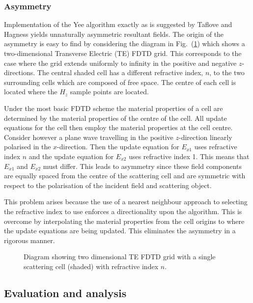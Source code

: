 \documentclass[a4paper, 12pt]{article}
\newcommand{\rfig}[1]{Fig.\ (\ref{#1})}
\begin{document}
	\subsubsection{Asymmetry}
	Implementation of the Yee algorithm exactly as is suggested by Taflove
	and Hagness \cite{taflove00book} yields unnaturally asymmetric
	resultant fields. The origin of the asymmetry is easy to find by
	considering the diagram in \rfig{fig:fdtd:2dasym} which shows a
	two-dimensional Transverse Electric (TE) FDTD grid. This corresponds
	to the case where the grid extends uniformly to infinity in the positive and
	negative $z$-directions. The central shaded cell has a different
	refractive index, $n$, to the two surrounding cells which are composed
	of free space. The centre of each cell
	is located where the $H_z$ sample points are located. 
	
	Under the most basic FDTD scheme the material properties of a cell are
	determined by the material properties of the centre of the cell. All
	update equations for the cell then employ the material properties at
	the cell centre. Consider however a plane wave travelling in the
	positive $z$-direction linearly polarised in the $x$-direction. Then
	the update equation for $E_{x1}$ uses refractive index $n$ and the
	update equation for $E_{x2}$ uses refractive index 1. This means that
	$E_{x1}$ and $E_{x2}$ must differ. This leads to asymmetry since these
	field components are equally spaced from the centre of the scattering
	cell and are symmetric with respect to the polarisation of the
	incident field and scattering object. 
	
	This problem arises because the use of a nearest neighbour approach to
	selecting the refractive index to use enforces a directionality upon
	the algorithm. This is overcome by interpolating the material
	properties from the cell origins to where the update equations are
	being updated. This eliminates the asymmetry in a rigorous manner.
	\begin{figure}[!h]
		\centering
		\caption{Diagram showing two dimensional TE FDTD grid with a single
			scattering cell (shaded) with refractive index $n$.}
		\label{fig:fdtd:2dasym}
	\end{figure}
	
	\subsection{Evaluation and analysis}
\end{document}
